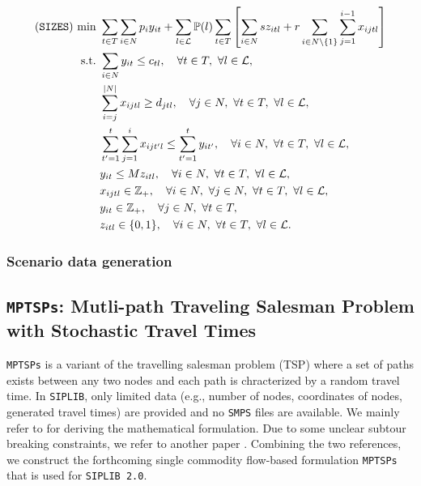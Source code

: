 \begin{subequations}
	\begin{align}
	(\texttt{SIZES})\ \textrm{min}\ &\sum_{t\in T}\sum_{i\in N} p_i y_{it} + \sum_{l\in \mathcal{L}} \PP(l)\sum_{t\in T}\left[\sum_{i\in N} sz_{itl}+r\sum_{i\in N\backslash\{1\}}\sum_{j=1}^{i-1}x_{ijtl}\right] \\
	\textrm{s.t.}\ &\sum_{i\in N}y_{it}\le c_{tl},\quad \forall t\in T,\ \forall l\in \mathcal{L}, \\
	&\sum_{i=j}^{|N|} x_{ijtl} \ge d_{jtl},\quad\forall j\in N,\ \forall t\in T,\  \forall l\in \mathcal{L},\\
	&\sum_{t'=1}^{t}\sum_{j=1}^{i}x_{ijt'l}\le\sum_{t'=1}^{t}y_{it'}, \quad\forall i\in N,\ \forall t\in T,\ \forall l\in \mathcal{L},\\
	&y_{it}\le Mz_{itl},\quad\forall i \in N,\ \forall t\in T,\ \forall l\in \mathcal{L},\\
	&x_{ijtl}\in\mathbb{Z}_+,\quad\forall i\in N,\ \forall j\in N,\ \forall t\in T,\ \forall l\in \mathcal{L},\\
	&y_{it}\in\mathbb{Z}_+,\quad \forall j\in N,\ \forall t\in T,\\
	&z_{itl}\in\{0,1\},\quad\forall i\in N,\ \forall t\in T,\ \forall l\in \mathcal{L}.
	\end{align}
\end{subequations}

\subsubsection{Scenario data generation}

\subsection{\texttt{MPTSPs}: Mutli-path Traveling Salesman Problem with Stochastic Travel Times}
\texttt{MPTSPs} is a variant of the travelling salesman problem (TSP) where a set of paths exists between any two nodes and each path is chracterized by a random travel time. In \texttt{SIPLIB}, only limited data (e.g., number of nodes, coordinates of nodes, generated travel times) are provided and no \texttt{SMPS} files are available. We mainly refer to \cite{journal:PGM2017} for deriving the mathematical formulation. Due to some unclear subtour breaking constraints, we refer to another paper \cite{journal:LSD1990}. Combining the two references, we construct the forthcoming single commodity flow-based formulation \texttt{MPTSPs} that is used for \texttt{SIPLIB 2.0}. 
